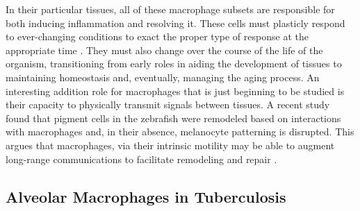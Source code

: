 In their particular tissues, all of these macrophage subsets are responsible for both inducing inflammation and resolving it. These cells must plasticly respond to ever\hyp{}changing conditions to exact the proper type of response at the appropriate time \citep{Pollard2009}. They must also change over the course of the life of the organism, transitioning from early roles in aiding the development of tissues to maintaining homeostasis and, eventually, managing the aging process. An interesting addition role for macrophages that is just beginning to be studied is their capacity to physically transmit signals between tissues. A recent study found that pigment cells in the zebrafish were remodeled based on interactions with macrophages and, in their absence, melanocyte patterning is disrupted. This argues that macrophages, via their intrinsic motility may be able to augment long\hyp{}range communications to facilitate remodeling and repair \citep{Eom2017}.

\subsection{Alveolar Macrophages in Tuberculosis}\label{alvmac}

